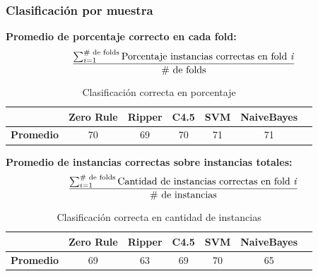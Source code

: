 \documentclass[mathserif]{beamer}%
\begin{document}
\begin{frame}[noframenumbering]
	\frametitle{Clasificación por muestra}
	
	\textbf{Promedio de porcentaje correcto en cada fold:}
	\[
	{ \sum_{i=1}^{\text{\# de folds}} \text{Porcentaje instancias correctas en fold \textit{i}}
	\over
	\text{\# de folds}
	}
	\]
	
{\small 	\begin{table}[H]
		\centering
		\begin{tabular}{|l|c|c|c|c|c|c|}
			\hline
			\textbf{}  & \textbf{Zero Rule} & \textbf{Ripper} & \textbf{C4.5} & \textbf{SVM} & \textbf{NaiveBayes} \\ \hline
			\textbf{Promedio} & 70  & 69 & 70 & 71 & 71 \\ \hline
		\end{tabular}
		\caption{Clasificación correcta en porcentaje}
		\label{HPTDT_clas_xval_porHab}
	\end{table}}
	
	\textbf{Promedio de instancias correctas sobre instancias totales:}
	\small
	\[
	{ \sum_{i=1}^{\text{\# de folds}} \text{Cantidad de instancias correctas en fold \textit{i}}
		\over
		\text{\# de instancias}
	}
	\]

{\small 	\begin{table}[H]
		\centering
		\begin{tabular}{|l|c|c|c|c|c|c|}
			\hline
			\textbf{}  & \textbf{Zero Rule} & \textbf{Ripper} & \textbf{C4.5} & \textbf{SVM} & \textbf{NaiveBayes} \\ \hline
			\textbf{Promedio} & 69  & 63 & 69 & 70 & 65 \\ \hline
		\end{tabular}
		\caption{Clasificación correcta en cantidad de instancias}
		\label{HPTDT_clas_xval_porHab}
	\end{table}}
	
\end{frame}
\end{document}
